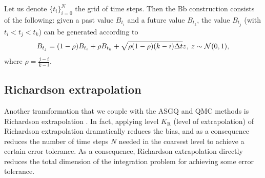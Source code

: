 Let us denote $\{t_i\}_{i=0}^{N}$ the grid of time steps. Then the Bb construction \cite{glasserman2004monte} consists of the following: given a past value $B_{t_i}$ and a future value $B_{t_k}$, the value $B_{t_j}$ (with $t_i < t_j < t_k$) can be generated according to 
\begin{equation*}
B_{t_j}=(1-\rho) B_{t_i}+\rho B_{t_k}+ \sqrt{\rho (1-\rho)(k-i) \Delta t} z, \: z \sim \mathcal{N}(0,1) ,
\end{equation*}
where $\rho=\frac{j-i}{k-i}$.  





%


\subsection{Richardson extrapolation}\label{sec:Richardson extrapolation}
Another transformation that we couple with the ASGQ and QMC methods is Richardson extrapolation \cite{talay1990expansion}. In fact, applying level $K_\text{R}$ (level of extrapolation) of Richardson extrapolation  dramatically reduces the bias, and as a consequence reduces the  number of time steps $N$ needed in the coarsest level to achieve a certain error tolerance. As a consequence, Richardson extrapolation directly reduces  the total dimension of the integration problem for achieving some error tolerance.

